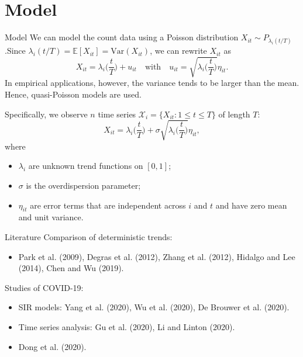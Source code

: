 \documentclass[10pt, handout]{beamer}
\newcommand{\E}{\mathbb{E}}
\newcommand{\Var}{\mathrm{Var}}
\begin{document}
\section{Model}
\begin{frame}{Model}
We can model the count data using a Poisson distribution $X_{it} \sim P_{\lambda_i(t/T)}$.\pause Since $\lambda_i(t/T) = \E[X_{it}] = \Var(X_{it})$, we can rewrite $X_{it}$ as
\vspace{-2mm}
\begin{equation*}
X_{it} = \lambda_i\Big(\frac{t}{T}\Big) + u_{it} \quad \text{with} \quad u_{it} = \sqrt{\lambda_i\Big(\frac{t}{T}\Big)} \eta_{it}.
\end{equation*}\pause
In empirical applications, however, the variance tends to be larger than the mean. Hence, quasi-Poisson models are used.\pause

Specifically, we observe $n$ time series $\mathcal{X}_i = \{X_{it}: 1 \le t \le T \}$ of length $T$:
\begin{equation*}
X_{it} = \lambda_i \Big( \frac{t}{T} \Big) + \sigma\sqrt{\lambda_i \Big( \frac{t}{T} \Big)} \eta_{it},
\end{equation*}\pause
\vspace{-3mm}
where
\begin{itemize}
\item $\lambda_i$ are unknown trend functions on $[0,1]$;
\item $\sigma$ is the overdispersion parameter;
\item $\eta_{it}$ are error terms that are independent across $i$ and $t$ and have zero mean and unit variance.
\end{itemize}
\end{frame}

\begin{frame}{Literature}
	Comparison of deterministic trends:
	\begin{itemize}
		\item Park et al. (2009), Degras et al. (2012), Zhang et al. (2012), Hidalgo and Lee (2014), Chen and Wu (2019).
	\end{itemize}\pause
	Studies of COVID-19:
	\begin{itemize}
		\item SIR models: Yang et al. (2020), Wu et al. (2020), De Brouwer et al. (2020).
		\item Time series analysis: Gu et al. (2020), Li and Linton (2020).
		\item Dong et al. (2020).
	\end{itemize}
\end{frame}
\end{document}
